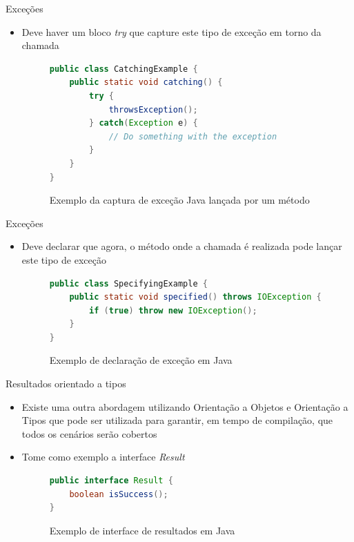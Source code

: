 \documentclass[brazilian]{beamer}
\begin{document}
\begin{frame}[fragile]{Exceções}
    \begin{itemize}
        \item Deve haver um bloco \emph{try} que capture este tipo de exceção em torno da chamada
        \begin{figure}[H]
            \centering
            \begin{lstlisting}[language=Java]
public class CatchingExample {
    public static void catching() {
        try {
            throwsException();
        } catch(Exception e) {
            // Do something with the exception
        }
    }
}
            \end{lstlisting}
            \caption{Exemplo da captura de exceção Java lançada por um método}
            \label{fig:java_catching_exception}
        \end{figure}
    \end{itemize}
\end{frame}

\begin{frame}[fragile]{Exceções}
    \begin{itemize}
        \item Deve declarar que agora, o método onde a chamada é realizada pode lançar este tipo de exceção
        \begin{figure}[H]
            \centering
            \begin{lstlisting}[language=Java]
public class SpecifyingExample {
    public static void specified() throws IOException {
        if (true) throw new IOException();
    }
}
            \end{lstlisting}
            \caption{Exemplo de declaração de exceção em Java}
            \label{fig:java_declaring_exception}
        \end{figure}
    \end{itemize}
\end{frame}

\begin{frame}[fragile]{Resultados orientado a tipos}
    \begin{itemize}
        \item Existe uma outra abordagem utilizando Orientação a Objetos e Orientação a Tipos que pode ser utilizada para garantir, em tempo de compilação, que todos os cenários serão cobertos
        \item Tome como exemplo a interface \emph{Result}
        \begin{figure}[H]
            \centering
            \begin{lstlisting}[language=Java]
public interface Result {
    boolean isSuccess();
}
            \end{lstlisting}
            \caption{Exemplo de interface de resultados em Java}
            \label{fig:java_result_interface}
        \end{figure}
    \end{itemize}
\end{frame}
\end{document}
